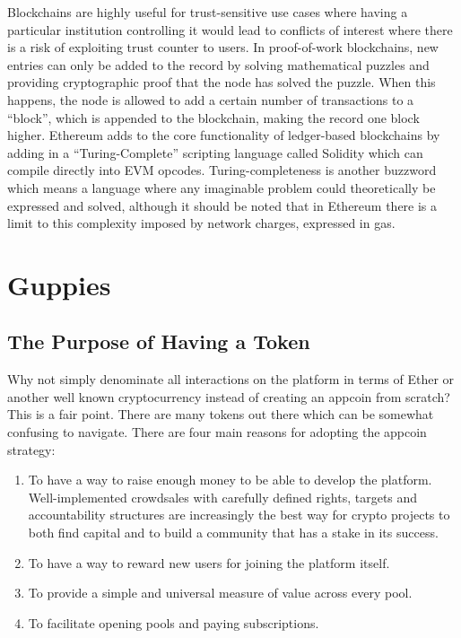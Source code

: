 \documentclass[a4paper]{article}
\begin{document}
Blockchains are highly useful for trust-sensitive use cases where having a particular institution controlling it would lead to conflicts of interest where there is a risk of exploiting trust counter to users. In proof-of-work blockchains, new entries can only be added to the record by solving mathematical puzzles and providing cryptographic proof that the node has solved the puzzle. When this happens, the node is allowed to add a certain number of transactions to a “block”, which is appended to the blockchain, making the record one block higher. Ethereum adds to the core functionality of ledger-based blockchains by adding in a “Turing-Complete” scripting language called Solidity which can compile directly into EVM opcodes. Turing-completeness is another buzzword which means a language where any imaginable problem could theoretically be expressed and solved, although it should be noted that in Ethereum there is a limit to this complexity imposed by network charges, expressed in gas.

\section{Guppies}
\subsection{The Purpose of Having a Token}
Why not simply denominate all interactions on the platform in terms of Ether or another well known cryptocurrency instead of creating an appcoin from scratch? This is a fair point. There are many tokens out there which can be somewhat confusing to navigate. There are four main reasons for adopting the appcoin strategy:
\begin{enumerate}

\item
To have a way to raise enough money to be able to develop the platform. Well-implemented crowdsales with carefully defined rights, targets and accountability structures are increasingly the best way for crypto projects to both find capital and to build a community that has a stake in its success.
\item
To have a way to reward new users for joining the platform itself.
\item
To provide a simple and universal measure of value across every pool.
\item
To facilitate opening pools and paying subscriptions.
\end{enumerate}
\end{document}
